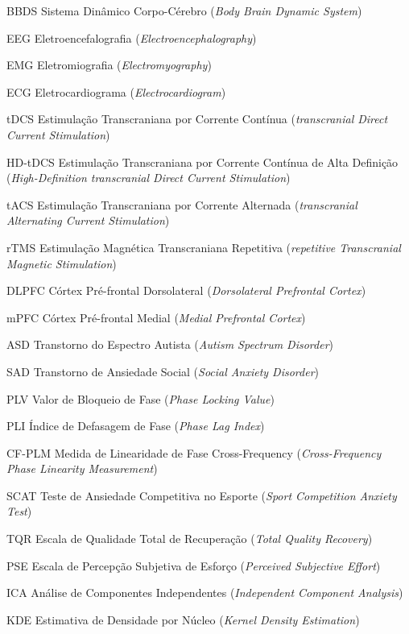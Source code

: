 \documentclass[
  12pt,
  openany,
  twoside,
  a4paper,
  english,
  brazil
]{abntex2}
\begin{document}
\begin{siglas}
  \item[BBDS] Sistema Dinâmico Corpo-Cérebro (\textit{Body Brain Dynamic System})
  \item[EEG] Eletroencefalografia (\textit{Electroencephalography})
  \item[EMG] Eletromiografia (\textit{Electromyography})
  \item[ECG] Eletrocardiograma (\textit{Electrocardiogram})
  \item[tDCS] Estimulação Transcraniana por Corrente Contínua (\textit{transcranial Direct Current Stimulation})
  \item[HD-tDCS] Estimulação Transcraniana por Corrente Contínua de Alta Definição (\textit{High-Definition transcranial Direct Current Stimulation})
  \item[tACS] Estimulação Transcraniana por Corrente Alternada (\textit{transcranial Alternating Current Stimulation})
  \item[rTMS] Estimulação Magnética Transcraniana Repetitiva (\textit{repetitive Transcranial Magnetic Stimulation})
  \item[DLPFC] Córtex Pré-frontal Dorsolateral (\textit{Dorsolateral Prefrontal Cortex})
  \item[mPFC] Córtex Pré-frontal Medial (\textit{Medial Prefrontal Cortex})
  \item[ASD] Transtorno do Espectro Autista (\textit{Autism Spectrum Disorder})
  \item[SAD] Transtorno de Ansiedade Social (\textit{Social Anxiety Disorder})
  \item[PLV] Valor de Bloqueio de Fase (\textit{Phase Locking Value})
  \item[PLI] Índice de Defasagem de Fase (\textit{Phase Lag Index})
  \item[CF-PLM] Medida de Linearidade de Fase Cross-Frequency (\textit{Cross-Frequency Phase Linearity Measurement})
  \item[SCAT] Teste de Ansiedade Competitiva no Esporte (\textit{Sport Competition Anxiety Test})
  \item[TQR] Escala de Qualidade Total de Recuperação (\textit{Total Quality Recovery})
  \item[PSE] Escala de Percepção Subjetiva de Esforço (\textit{Perceived Subjective Effort})
  \item[ICA] Análise de Componentes Independentes (\textit{Independent Component Analysis})
  \item[KDE] Estimativa de Densidade por Núcleo (\textit{Kernel Density Estimation})

\end{siglas}
\end{document}
